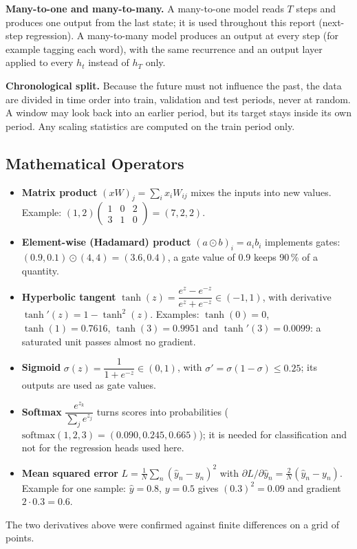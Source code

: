 \documentclass[11pt, a4paper]{article}
\begin{document}
\textbf{Many-to-one and many-to-many.} A many-to-one model reads $T$ steps and produces one output from the last state; it is used throughout this report
(next-step regression). A many-to-many model produces an output at every step (for example tagging each word), with the same recurrence and an output layer applied to every
$h_t$ instead of $h_T$ only.

\textbf{Chronological split.} Because the future must not influence the past, the data are divided in time order into train, validation and test periods, never at random.
A window may look back into an earlier period, but its target stays inside its own period. Any scaling statistics are computed on the train period only.

\subsection{Mathematical Operators}
\label{sec:ops}

\begin{itemize}
\item \textbf{Matrix product} $(xW)_j=\sum_i x_iW_{ij}$ mixes the inputs into new values. Example: $(1,2)\begin{pmatrix}1&0&2\\3&1&0\end{pmatrix}=(7,2,2)$.
\item \textbf{Element-wise (Hadamard) product} $(a\odot b)_i=a_ib_i$ implements gates: $(0.9,0.1)\odot(4,4)=(3.6,0.4)$, a gate value of 0.9 keeps 90\,\% of a quantity.
\item \textbf{Hyperbolic tangent} $\tanh(z)=\dfrac{e^z-e^{-z}}{e^z+e^{-z}}\in(-1,1)$, with derivative $\tanh'(z)=1-\tanh^2(z)$. Examples: $\tanh(0)=0$, $\tanh(1)=0.7616$,
  $\tanh(3)=0.9951$ and $\tanh'(3)=0.0099$: a saturated unit passes almost no gradient.
\item \textbf{Sigmoid} $\sigma(z)=\dfrac{1}{1+e^{-z}}\in(0,1)$, with $\sigma'=\sigma(1-\sigma)\le0.25$; its outputs are used as gate values.
\item \textbf{Softmax} $\dfrac{e^{z_k}}{\sum_je^{z_j}}$ turns scores into probabilities ($\mathrm{softmax}(1,2,3)=(0.090,0.245,0.665)$); it is needed for classification and not for the regression heads used here.
\item \textbf{Mean squared error} $L=\frac1N\sum_n(\hat y_n-y_n)^2$ with $\partial L/\partial\hat y_n=\frac{2}{N}(\hat y_n-y_n)$. Example for one sample: $\hat y=0.8$, $y=0.5$ gives $(0.3)^2=0.09$ and gradient $2\cdot0.3=0.6$.
\end{itemize}
The two derivatives above were confirmed against finite differences on a grid of points.
\end{document}
